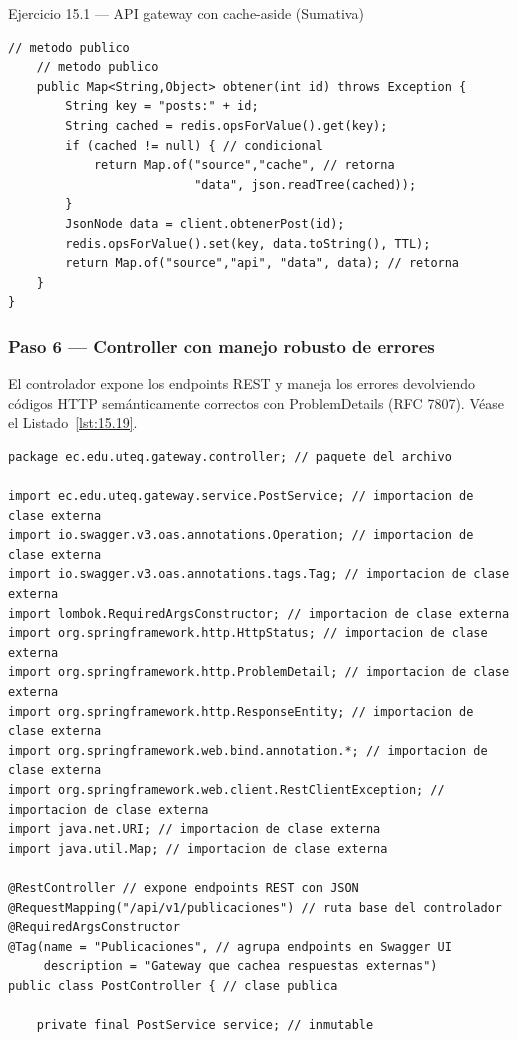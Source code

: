 \begin{cajaejercicio}{Ejercicio 15.1 --- API gateway con cache-aside (Sumativa)}
\begin{lstlisting}[style=java,caption={PostService.java},label=lst:15.18]
    // metodo publico
    // metodo publico
    public Map<String,Object> obtener(int id) throws Exception {
        String key = "posts:" + id;
        String cached = redis.opsForValue().get(key);
        if (cached != null) { // condicional
            return Map.of("source","cache", // retorna
                          "data", json.readTree(cached));
        }
        JsonNode data = client.obtenerPost(id);
        redis.opsForValue().set(key, data.toString(), TTL);
        return Map.of("source","api", "data", data); // retorna
    }
}
\end{lstlisting}

\subsubsection*{Paso 6 --- Controller con manejo robusto de errores}

El controlador expone los endpoints REST y maneja los
errores devolviendo códigos HTTP semánticamente correctos con
ProblemDetails (RFC 7807). V\'ease el Listado~\ref{lst:15.19}.


\begin{lstlisting}[style=java,caption={PostController.java},label=lst:15.19]
package ec.edu.uteq.gateway.controller; // paquete del archivo

import ec.edu.uteq.gateway.service.PostService; // importacion de clase externa
import io.swagger.v3.oas.annotations.Operation; // importacion de clase externa
import io.swagger.v3.oas.annotations.tags.Tag; // importacion de clase externa
import lombok.RequiredArgsConstructor; // importacion de clase externa
import org.springframework.http.HttpStatus; // importacion de clase externa
import org.springframework.http.ProblemDetail; // importacion de clase externa
import org.springframework.http.ResponseEntity; // importacion de clase externa
import org.springframework.web.bind.annotation.*; // importacion de clase externa
import org.springframework.web.client.RestClientException; // importacion de clase externa
import java.net.URI; // importacion de clase externa
import java.util.Map; // importacion de clase externa

@RestController // expone endpoints REST con JSON
@RequestMapping("/api/v1/publicaciones") // ruta base del controlador
@RequiredArgsConstructor
@Tag(name = "Publicaciones", // agrupa endpoints en Swagger UI
     description = "Gateway que cachea respuestas externas")
public class PostController { // clase publica

    private final PostService service; // inmutable


\end{lstlisting}
\end{cajaejercicio}
